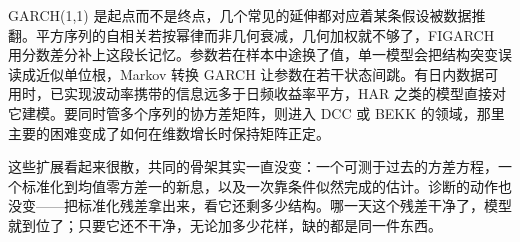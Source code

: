 GARCH(1,1) 是起点而不是终点，几个常见的延伸都对应着某条假设被数据推翻。平方序列的自相关若按幂律而非几何衰减，几何加权就不够了，FIGARCH 用分数差分补上这段长记忆。参数若在样本中途换了值，单一模型会把结构突变误读成近似单位根，Markov 转换 GARCH 让参数在若干状态间跳。有日内数据可用时，已实现波动率携带的信息远多于日频收益率平方，HAR 之类的模型直接对它建模。要同时管多个序列的协方差矩阵，则进入 DCC 或 BEKK 的领域，那里主要的困难变成了如何在维数增长时保持矩阵正定。

这些扩展看起来很散，共同的骨架其实一直没变：一个可测于过去的方差方程，一个标准化到均值零方差一的新息，以及一次靠条件似然完成的估计。诊断的动作也没变——把标准化残差拿出来，看它还剩多少结构。哪一天这个残差干净了，模型就到位了；只要它还不干净，无论加多少花样，缺的都是同一件东西。
